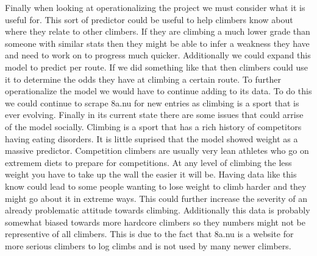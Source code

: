 \documentclass[]{article}
\begin{document}
Finally when looking at operationalizing the project we must consider
what it is useful for. This sort of predictor could be useful to help
climbers know about where they relate to other climbers. If they are
climbing a much lower grade than someone with similar stats then they
might be able to infer a weakness they have and need to work on to
progress much quicker. Additionally we could expand this model to
predict per route. If we did something like that then climbers could use
it to determine the odds they have at climbing a certain route. To
further operationalize the model we would have to continue adding to its
data. To do this we could continue to scrape 8a.nu for new entries as
climbing is a sport that is ever evolving. Finally in its current state
there are some issues that could arrise of the model socially. Climbing
is a sport that has a rich history of competitors having eating
disorders. It is little suprised that the model showed weight as a
massive predictor. Competition climbers are usually very lean athletes
who go on extremem diets to prepare for competitions. At any level of
climbing the less weight you have to take up the wall the easier it will
be. Having data like this know could lead to some people wanting to lose
weight to climb harder and they might go about it in extreme ways. This
could further increase the severity of an already problematic attitude
towards climbing. Additionally this data is probably somewhat biased
towards more hardcore climbers so they numbers might not be representive
of all climbers. This is due to the fact that 8a.nu is a website for
more serious climbers to log climbs and is not used by many newer
climbers.
\end{document}
